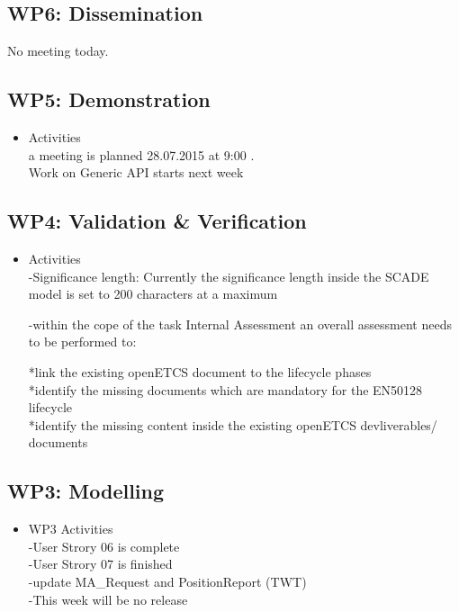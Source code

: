 \documentclass[a4paper, 11pt]{article}
\begin{document}
\subsection{WP6: Dissemination}

 No meeting today.
 
\subsection{WP5: Demonstration}

\begin{itemize}
\item Activities\\

a meeting is planned 28.07.2015
at 9:00 .\\


Work on Generic API starts next week \\

\end{itemize}

\subsection{WP4: Validation \& Verification}
\begin{itemize}
\item Activities\\

  


-Significance length:
Currently the significance length inside the SCADE model is set to 200 characters at a maximum


-within the cope of the task Internal Assessment an overall assessment needs to be performed to:

*link the existing openETCS document to the lifecycle phases\\
*identify the missing documents which are mandatory for the EN50128 lifecycle\\
*identify the missing content inside the existing openETCS devliverables/ documents\\
\end{itemize}

\subsection{WP3: Modelling}

\begin{itemize}
\item WP3 Activities\\
-User Strory 06 is complete\\
-User Strory 07 is finished\\
-update MA\_Request and PositionReport (TWT)\\
-This week will be no release\\
\end{itemize}
\end{document}

